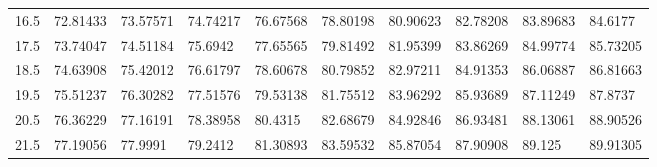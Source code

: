\documentclass[10pt,twocolumn,letterpaper]{article}
\begin{document}
\begin{table}
{\begin{tabular}{llllllllll}
    16.5            & 72.81433                               & 73.57571                               & 74.74217                                & 76.67568                                & 78.80198                                & 80.90623                                & 82.78208                                & 83.89683                                & 84.6177                                 \\
    17.5            & 73.74047                               & 74.51184                               & 75.6942                                 & 77.65565                                & 79.81492                                & 81.95399                                & 83.86269                                & 84.99774                                & 85.73205                                \\
    18.5            & 74.63908                               & 75.42012                               & 76.61797                                & 78.60678                                & 80.79852                                & 82.97211                                & 84.91353                                & 86.06887                                & 86.81663                                \\
    19.5            & 75.51237                               & 76.30282                               & 77.51576                                & 79.53138                                & 81.75512                                & 83.96292                                & 85.93689                                & 87.11249                                & 87.8737                                 \\
    20.5            & 76.36229                               & 77.16191                               & 78.38958                                & 80.4315                                 & 82.68679                                & 84.92846                                & 86.93481                                & 88.13061                                & 88.90526                                \\
    21.5            & 77.19056                               & 77.9991                                & 79.2412                                 & 81.30893                                & 83.59532                                & 85.87054                                & 87.90908                                & 89.125                                  & 89.91305                                \\

\end{tabular}}
\end{table}
\end{document}
